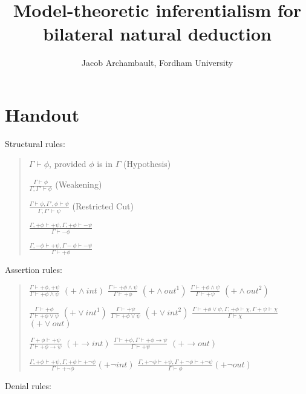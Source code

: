 \documentclass[]{article}
\title{Model-theoretic inferentialism for bilateral natural deduction}
\author{Jacob Archambault, Fordham University}
\begin{document}
\maketitle
\section{Handout}
Structural rules:
\begin{quote}
$\Gamma \vdash \phi$, provided $\phi$ is in $\Gamma$ (Hypothesis)

$\frac{\Gamma \vdash \phi}{\Gamma, \Gamma' \vdash \phi}$ (Weakening)

$\frac{\Gamma \vdash \phi, \Gamma', \phi \vdash \psi}{\Gamma, \Gamma' \vdash \psi}$ (Restricted Cut)

$\frac{\Gamma, +\phi \vdash +\psi, \Gamma, +\phi \vdash -\psi}{\Gamma \vdash -\phi}$

$\frac{\Gamma, -\phi \vdash +\psi, \Gamma -\phi \vdash -\psi}{\Gamma \vdash +\phi}$
\end{quote}

Assertion rules:

\begin{quote}
$\frac{\Gamma \vdash +\phi, +\psi}{\Gamma \vdash +\phi\wedge\psi}$ $(+\wedge int)$ 
$\frac{\Gamma \vdash +\phi\wedge\psi}{\Gamma \vdash +\phi}$ $(+\wedge out^{1})$ 
$\frac{\Gamma \vdash +\phi\wedge\psi}{\Gamma \vdash +\psi}$ $(+\wedge out^{2})$

$\frac{\Gamma \vdash +\phi}{\Gamma \vdash +\phi\vee\psi}$ $(+\vee int^{1})$ 
$\frac{\Gamma \vdash +\psi}{\Gamma \vdash +\phi\vee\psi}$ $(+\vee int^{2})$ 
$\frac{\Gamma \vdash +\phi\vee\psi, \Gamma, +\phi \vdash \chi, \Gamma +\psi \vdash \chi}{\Gamma \vdash \chi}$ $(+\vee out)$

$\frac{\Gamma +\phi \vdash +\psi}{\Gamma \vdash +\phi\rightarrow\psi}$ $(+\rightarrow int)$ 
$\frac{\Gamma \vdash +\phi, \Gamma \vdash +\phi\rightarrow\psi}{\Gamma \vdash +\psi}$ $(+\rightarrow out)$

$\frac{\Gamma, +\phi \vdash +\psi, \Gamma, +\phi \vdash +\neg \psi}{\Gamma \vdash +\neg\phi} (+\neg int)$
$\frac{\Gamma, +\neg\phi \vdash +\psi, \Gamma +\neg\phi \vdash +\neg\psi}{\Gamma \vdash \phi} (+\neg out)$
\end{quote}

Denial rules:
\end{document}
